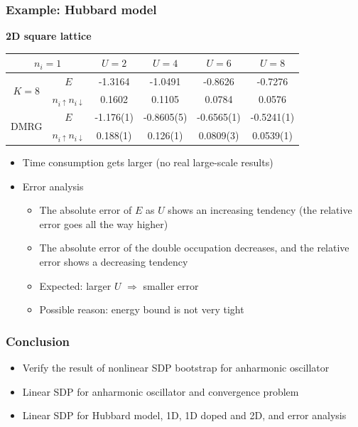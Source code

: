 \documentclass{beamer}
\begin{document}
\begin{frame}
\frametitle{Example: Hubbard model}

\textbf{2D square lattice}    

\begin{center}
    \begin{tabular}{cccccc}
        \toprule
        \multicolumn{2}{c}{$n_i=1$}                                 & $U=2$   & $U=4$   & $U=6$   & $U=8$  \\
        \midrule
        \multirow{2}{*}{$K=8$}     & $E$                               & -1.3164 & -1.0491 & -0.8626 & -0.7276  \\
                                    & $n_{i \uparrow} n_{i \downarrow}$ &  0.1602 &  0.1105 &  0.0784 &  0.0576  \\
        \midrule
        \multirow{2}{*}{DMRG}  & $E$                               & -1.176(1) & -0.8605(5) & -0.6565(1) & -0.5241(1)  \\
                                    & $n_{i \uparrow} n_{i \downarrow}$ &  0.188(1) &  0.126(1) &  0.0809(3) &  0.0539(1)  \\
        \bottomrule
    \end{tabular}
\end{center}

\begin{itemize}
    \item Time consumption gets larger (no real large-scale results)
    \item Error analysis
    \begin{itemize}
        \item The absolute error of $E$ as $U$ shows an increasing tendency (the relative error goes all the way higher)
        \item The absolute error of the double occupation decreases, and the relative error shows a decreasing tendency
        \item Expected: larger $U$ $\Rightarrow$ smaller error 
        \item Possible reason: energy bound is not very tight 
    \end{itemize}
    
\end{itemize}

\end{frame}

\begin{frame}
\frametitle{Conclusion}

\begin{itemize}
    \item Verify the result of nonlinear SDP bootstrap for anharmonic oscillator
    \item Linear SDP for anharmonic oscillator and convergence problem
    \item Linear SDP for Hubbard model, 1D, 1D doped and 2D, and error analysis
\end{itemize}    

\end{frame}
\end{document}
